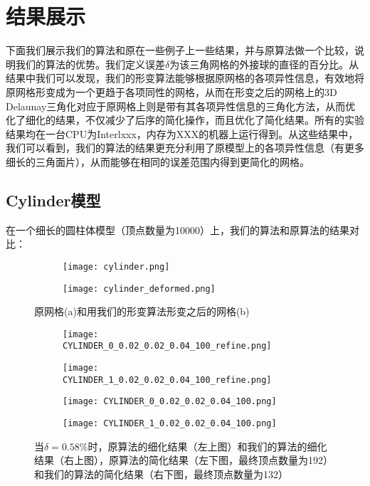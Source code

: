 \chapter{结果展示}
下面我们展示我们的算法和原在一些例子上一些结果，并与原算法做一个比较，说明我们的算法的优势。我们定义误差$\delta$为该三角网格的外接球的直径的百分比。从结果中我们可以发现，我们的形变算法能够根据原网格的各项异性信息，有效地将原网格形变成为一个更趋于各项同性的网格，从而在形变之后的网格上的3D Delaunay三角化对应于原网格上则是带有其各项异性信息的三角化方法，从而优化了细化的结果，不仅减少了后序的简化操作，而且优化了简化结果。所有的实验结果均在一台CPU为Interlxxx，内存为XXX的机器上运行得到。从这些结果中，我们可以看到，我们的算法的结果更充分利用了原模型上的各项异性信息（有更多细长的三角面片），从而能够在相同的误差范围内得到更简化的网格。

\section{Cylinder模型}
在一个细长的圆柱体模型（顶点数量为10000）上，我们的算法和原算法的结果对比：
\begin{figure}[htbp]
  \centering
  \begin{subfigure}[b]{0.4\textwidth}
    \texttt{[image: cylinder.png]}
    \end{subfigure}
    \begin{subfigure}[b]{0.4\textwidth}
      \texttt{[image: cylinder\_deformed.png]}
    \end{subfigure}
    \caption[Cylinder形变结果]{原网格(a)和用我们的形变算法形变之后的网格(b)}
    \label{fig:cylinder-deform}
\end{figure}


\begin{figure}[htbp]
  \centering
  \begin{subfigure}[b]{0.4\textwidth}
    \texttt{[image: CYLINDER\_0\_0.02\_0.02\_0.04\_100\_refine.png]}
  \end{subfigure}
  \begin{subfigure}[b]{0.4\textwidth}
    \texttt{[image: CYLINDER\_1\_0.02\_0.02\_0.04\_100\_refine.png]}
  \end{subfigure}
  \begin{subfigure}[b]{0.4\textwidth}
    \texttt{[image: CYLINDER\_0\_0.02\_0.02\_0.04\_100.png]}
  \end{subfigure}
  \begin{subfigure}[b]{0.4\textwidth}
    \texttt{[image: CYLINDER\_1\_0.02\_0.02\_0.04\_100.png]}
  \end{subfigure}
  \caption[当$\delta=0.58\%$时Cylinder结果对比]{当$\delta=0.58\%$时，原算法的细化结果（左上图）和我们的算法的细化结果（右上图），原算法的简化结果（左下图，最终顶点数量为192）和我们的算法的简化结果（右下图，最终顶点数量为132）}
  \label{fig:cylinder-res1}
\end{figure}

